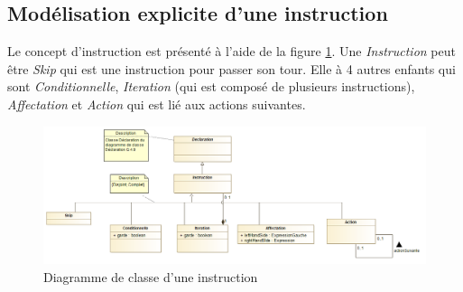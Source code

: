
\subsection{Modélisation explicite d'une instruction}
\label{sec:question13}

Le concept d'instruction est présenté à l'aide de la figure \ref{fig:instruction}. Une \emph{Instruction} peut être \emph{Skip} qui est une instruction pour passer son tour. Elle à 4 autres enfants qui sont \emph{Conditionnelle}, \emph{Iteration} (qui est composé
de plusieurs instructions), \emph{Affectation} et \emph{Action} qui est lié aux actions suivantes.

\begin{figure}[h!]
	\centering
	\includegraphics[width=450pt]{assets/class__Instruction}
	\caption{Diagramme de classe d'une instruction}
	\label{fig:instruction}
\end{figure}

\newpage